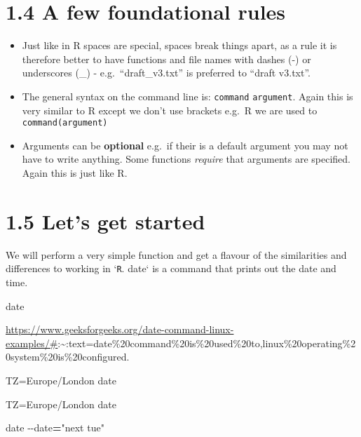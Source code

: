 \documentclass[
]{book}
\newenvironment{Shaded}{\begin{snugshade}}{\end{snugshade}}
\newcommand{\AttributeTok}[1]{\textcolor[rgb]{0.77,0.63,0.00}{#1}}
\newcommand{\FunctionTok}[1]{\textcolor[rgb]{0.00,0.00,0.00}{#1}}
\newcommand{\NormalTok}[1]{#1}
\newcommand{\OperatorTok}[1]{\textcolor[rgb]{0.81,0.36,0.00}{\textbf{#1}}}
\newcommand{\StringTok}[1]{\textcolor[rgb]{0.31,0.60,0.02}{#1}}
\newcommand{\VariableTok}[1]{\textcolor[rgb]{0.00,0.00,0.00}{#1}}
\begin{document}
\hypertarget{a-few-foundational-rules}{%
\section{1.4 A few foundational rules}\label{a-few-foundational-rules}}

\begin{itemize}
\item
  Just like in R spaces are special, spaces break things apart, as a rule it is therefore better to have functions and file names with dashes (-) or underscores (\_) - e.g.~``draft\_v3.txt'' is preferred to ``draft v3.txt''.
\item
  The general syntax on the command line is: \texttt{command} \texttt{argument}. Again this is very similar to R except we don't use brackets e.g.~R we are used to \texttt{command(argument)}
\item
  Arguments can be \textbf{optional} e.g.~if their is a default argument you may not have to write anything. Some functions \emph{require} that arguments are specified. Again this is just like R.
\end{itemize}

\hypertarget{lets-get-started}{%
\section{1.5 Let's get started}\label{lets-get-started}}

We will perform a very simple function and get a flavour of the similarities and differences to working in `\texttt{R}. date` is a command that prints out the date and time.

\begin{Shaded}
\begin{Highlighting}[]
    \FunctionTok{date}
\end{Highlighting}
\end{Shaded}

\url{https://www.geeksforgeeks.org/date-command-linux-examples/\#}:\textasciitilde:text=date\%20command\%20is\%20used\%20to,linux\%20operating\%20system\%20is\%20configured.

\begin{Shaded}
\begin{Highlighting}[]
    \VariableTok{TZ=}\NormalTok{Europe/London }\FunctionTok{date}

    \VariableTok{TZ=}\NormalTok{Europe/London }\FunctionTok{date}

    \FunctionTok{date} \AttributeTok{{-}{-}date}\OperatorTok{=}\StringTok{"next tue"}
\end{Highlighting}
\end{Shaded}
\end{document}

